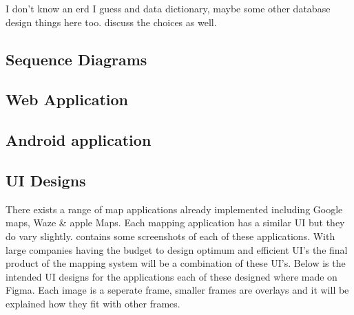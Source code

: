 I don't know an erd I guess and data dictionary, maybe some other database design things here too. discuss the choices as well.

\subsection{Sequence Diagrams}
\subsection{Web Application}

\subsection{Android application}

\subsection{UI Designs}
There exists a range of map applications already implemented including Google maps, Waze \& apple Maps. Each mapping application has a similar UI but they do vary slightly. \appendixtemp contains some screenshots of each of these applications. With large companies having the budget to design optimum and efficient UI's the final product of the mapping system will be a combination of these UI's. Below is the intended UI designs for the applications each of these designed where made on Figma. Each image is a seperate frame, smaller frames are overlays and it will be explained how they fit with other frames.

